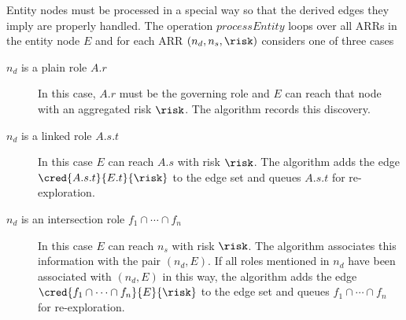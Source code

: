 Entity nodes must be processed in a special way so that the derived edges they imply are
properly handled. The operation $\mathit{processEntity}$ loops over all ARRs in the entity node
$E$ and for each ARR $(n_d, n_s, \risk)$ considers one of three cases
\begin{description}
\item[$n_d$ is a plain role $A.r$] In this case, $A.r$ must be the governing role and $E$ can
  reach that node with an aggregated risk $\risk$. The algorithm records this discovery.
\item[$n_d$ is a linked role $A.s.t$] In this case $E$ can reach $A.s$ with risk $\risk$. The
  algorithm adds the edge $\cred{A.s.t}{E.t}{\risk}$ to the edge set and queues $A.s.t$ for
  re-exploration.
\item[$n_d$ is an intersection role $f_1 \cap \cdots \cap f_n$] In this case $E$ can reach $n_s$
  with risk $\risk$. The algorithm associates this information with the pair $(n_d, E)$. If all
  roles mentioned in $n_d$ have been associated with $(n_d, E)$ in this way, the algorithm adds
  the edge $\cred{f_1 \cap \cdots \cap f_n}{E}{\risk}$ to the edge set and queues $f_1 \cap
  \cdots \cap f_n$ for re-exploration.
\end{description}

